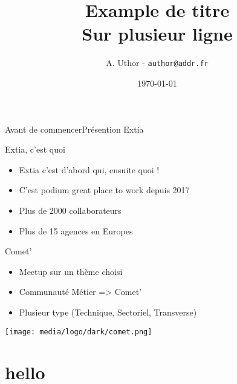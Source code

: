 \documentclass{beamer}
\title{Example de titre \\Sur plusieur ligne}
\date{\today}
\author{A. Uthor - \texttt{author@addr.fr}}
\begin{document}
{
    \begin{frame}
        \titlepage
    \end{frame}
}

\begin{frame}{Avant de commencer}{Présention Extia}
    \begin{block}{Extia, c'est quoi}
        \begin{minipage}{0.7\paperwidth}
            \begin{itemize}
                \item Extia c'est d'abord qui, ensuite quoi !
                \item C'est podium great place to work depuis 2017
                \item Plus de 2000 collaborateurs
                \item Plus de 15 agences en Europes
            \end{itemize}
        \end{minipage}
    \end{block}
    \begin{block}{Comet'}
        \begin{minipage}{0.7\paperwidth}
            \begin{itemize}
                \item Meetup sur un thème choisi
                \item Communauté Métier => Comet'
                \item Plusieur type (Technique, Sectoriel, Transverse)
            \end{itemize}
        \end{minipage}
        \begin{minipage}{0.2\paperwidth}
            \begin{center}
                \texttt{[image: media/logo/dark/comet.png]}
            \end{center}
        \end{minipage}
    \end{block}
\end{frame}

\section{hello}
\end{document}
